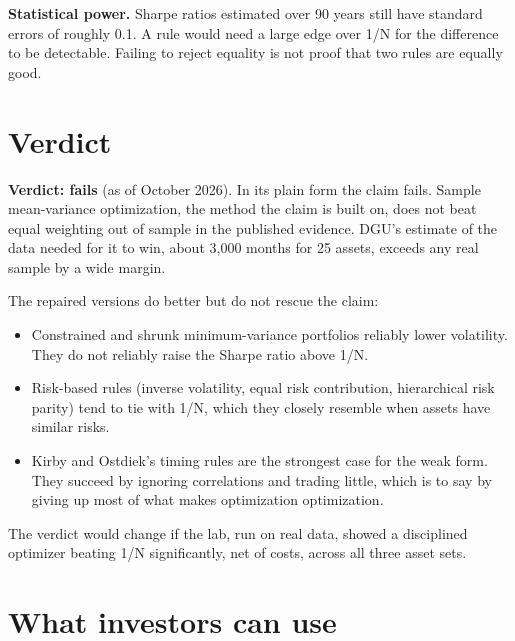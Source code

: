 \textbf{Statistical power.} Sharpe ratios estimated over 90 years still have standard errors of roughly 0.1. A rule would need a large edge over 1/N for the difference to be detectable. Failing to reject equality is not proof that two rules are equally good.

\section{Verdict}
\label{sec:19-verdict}

\begin{callout}
\textbf{Verdict: fails} (as of October 2026). In its plain form the claim fails. Sample mean-variance optimization, the method the claim is built on, does not beat equal weighting out of sample in the published evidence. DGU's estimate of the data needed for it to win, about 3,000 months for 25 assets, exceeds any real sample by a wide margin.
\end{callout}

The repaired versions do better but do not rescue the claim:

\begin{itemize}
  \item Constrained and shrunk minimum-variance portfolios reliably lower volatility. They do not reliably raise the Sharpe ratio above 1/N.
  \item Risk-based rules (inverse volatility, equal risk contribution, hierarchical risk parity) tend to tie with 1/N, which they closely resemble when assets have similar risks.
  \item Kirby and Ostdiek's timing rules are the strongest case for the weak form. They succeed by ignoring correlations and trading little, which is to say by giving up most of what makes optimization optimization.
\end{itemize}

The verdict would change if the lab, run on real data, showed a disciplined optimizer beating 1/N significantly, net of costs, across all three asset sets.

\section{What investors can use}
\label{sec:19-investors}

